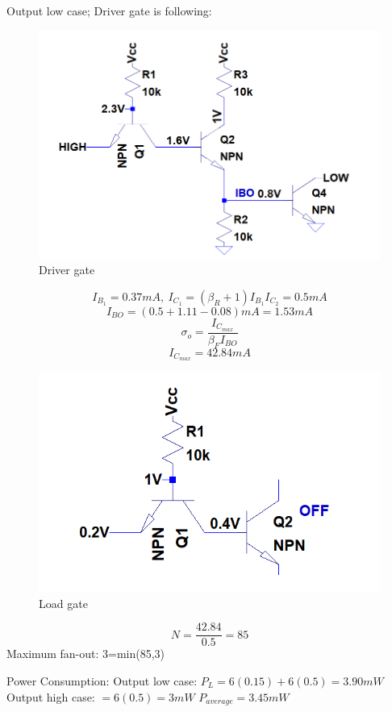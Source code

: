 \documentclass[11 pt]{article}
\begin{document}
Output low case;
Driver gate is following:
\begin{figure}[H]
  \includegraphics[width=\linewidth]{as}
  \caption{Driver gate}
  \label{fig:zero}
\end{figure}
$$I_{B_1}=0.37mA ,\> I_{C_1}=(\beta_R+1)I_{B_1} I_{C_2}=0.5mA$$ 
$$I_{BO}=(0.5 + 1.11 - 0.08)mA = 1.53 mA $$
$$\sigma_o = \frac{I_{C_{max}}}{\beta_F I_{BO}}$$
$$I_{C_{max}}=42.84 mA$$

\begin{figure}[H]
  \includegraphics[width=\linewidth]{load}
  \caption{Load gate}
  \label{fig:zero}
\end{figure}

$$N = \frac{42.84}{0.5}=85$$
Maximum fan-out:
3=min(85,3)

Power Consumption:
Output low case:
$P_L=6(0.15)+6(0.5)=3.90mW$
Output high case:
$=6(0.5)=3mW$
$P_{average}=3.45mW$
\end{document}
